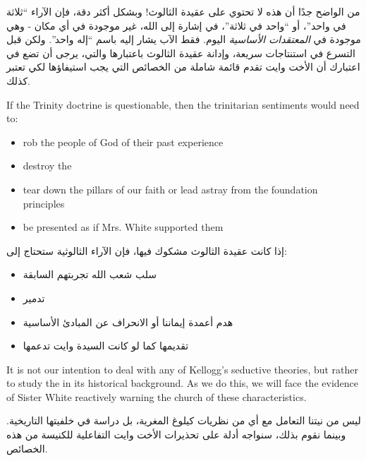 من الواضح جدًا أن هذه  لا تحتوي على عقيدة الثالوث! وبشكل أكثر دقة، فإن الآراء “ثلاثة في واحد”، أو “واحد في ثلاثة”، في إشارة إلى الله، غير موجودة في أي مكان - وهي موجودة في \textit{المعتقدات الأساسية} اليوم. فقط الآب يشار إليه باسم “إله واحد”. ولكن قبل التسرع في استنتاجات سريعة، وإدانة عقيدة الثالوث باعتبارها والتي، يرجى أن تضع في اعتبارك أن الأخت وايت تقدم قائمة شاملة من الخصائص التي يجب استيفاؤها لكي تعتبر كذلك.


If the Trinity doctrine is questionable, then the trinitarian sentiments would need to:
\begin{itemize}
    \item rob the people of God of their past experience
    \item destroy the 
    \item tear down the pillars of our faith or lead astray from the foundation principles
    \item be presented as if Mrs. White supported them
\end{itemize}


إذا كانت عقيدة الثالوث مشكوك فيها، فإن الآراء الثالوثية ستحتاج إلى:
\begin{itemize}
    \item سلب شعب الله تجربتهم السابقة
    \item تدمير 
    \item هدم أعمدة إيماننا أو الانحراف عن المبادئ الأساسية
    \item تقديمها كما لو كانت السيدة وايت تدعمها
\end{itemize}


It is not our intention to deal with any of Kellogg’s seductive theories, but rather to study the  in its historical background. As we do this, we will face the evidence of Sister White reactively warning the church of these characteristics.


ليس من نيتنا التعامل مع أي من نظريات كيلوغ المغرية، بل دراسة  في خلفيتها التاريخية. وبينما نقوم بذلك، سنواجه أدلة على تحذيرات الأخت وايت التفاعلية للكنيسة من هذه الخصائص.


